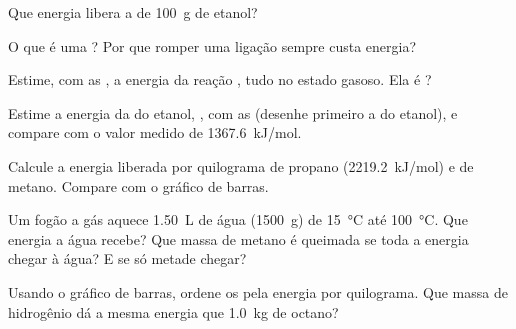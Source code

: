 \begin{exercise}[$\star$]\label{exo:g11:reaction-energy:4}
Que energia libera a  de \qty{100}{g} de etanol?
\end{exercise}

\begin{exercise}[$\star$]\label{exo:g11:reaction-energy:5}
O que é uma ? Por que romper uma ligação sempre custa
energia?
\end{exercise}

\begin{exercise}[$\star\star$]\label{exo:g11:reaction-energy:6}
Estime, com as , a energia da reação
, tudo no estado gasoso. Ela é ?
\end{exercise}

\begin{exercise}[$\star\star$]\label{exo:g11:reaction-energy:7}
Estime a energia da  do etanol, , com as  (desenhe primeiro a  do etanol), e compare com o valor medido de
\qty{1367.6}{kJ/mol}.
\end{exercise}

\begin{exercise}[$\star\star$]\label{exo:g11:reaction-energy:8}
Calcule a energia liberada por quilograma de propano
(\qty{2219.2}{kJ/mol}) e de metano. Compare com o gráfico de barras.
\end{exercise}

\begin{exercise}[$\star\star$]\label{exo:g11:reaction-energy:9}
Um fogão a gás aquece \qty{1.50}{L} de água (\qty{1500}{g}) de
\qty{15}{\celsius} até \qty{100}{\celsius}. Que energia a água recebe?
Que massa de metano é queimada se toda a energia chegar à água? E se só
metade chegar?
\end{exercise}

\begin{exercise}[$\star\star$]\label{exo:g11:reaction-energy:10}
Usando o gráfico de barras, ordene os  pela energia por
quilograma. Que massa de hidrogênio dá a mesma energia que
\qty{1.0}{kg} de octano?
\end{exercise}

